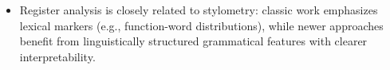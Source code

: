 \documentclass[11pt]{article}
\begin{document}
\begin{itemize}
\begin{itemize}
      \begin{itemize}
        \item \textbf{T}ense: PAST, \textbf{A}spect: SIMPLE, \textbf{M}ood: INDICATIVE, \textbf{V}oice: PASSIVE
      \end{itemize}
      \item News: \emph{``Three people were killed in the accident.''} (passive preferred)
      \begin{itemize}
        \item \textbf{T}ense: PAST, \textbf{A}spect: SIMPLE, \textbf{M}ood: INDICATIVE, \textbf{V}oice: PASSIVE
      \end{itemize}
    \end{itemize}
  \item Register analysis is closely related to stylometry: classic work emphasizes lexical markers (e.g., function-word distributions), while newer approaches benefit from linguistically structured grammatical features with clearer interpretability. \citep{Mosteller1964InferenceDisputedAuthorship,Argamon2007StylisticTextClassification,Biber2009RegisterGenreStyle}
\end{itemize}
\end{document}
